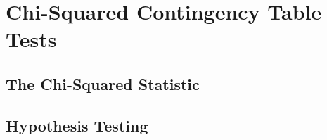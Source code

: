 \documentclass[../maths.tex]{subfiles}
\begin{document}
\chapter{Chi-Squared Contingency Table Tests}
\section{The Chi-Squared Statistic}
\section{Hypothesis Testing}
\end{document}

